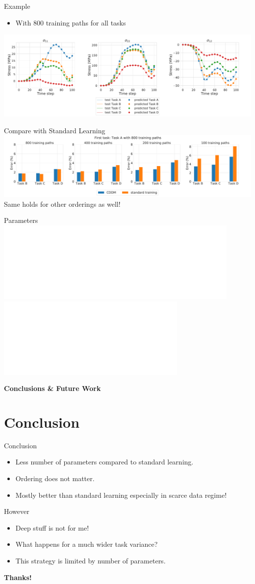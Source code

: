 \documentclass[aspectratio=169]{beamer}
\newcommand{\conc}{\color{Pink}\huge{\textbf{Conclusions \& Future Work}}}
\newcommand{\thnx}{\color{Pink}\huge{\textbf{Thanks!}}}
\begin{document}
\begin{frame}{Example}
    \begin{itemize}
      \item With 800 training paths for all tasks
    \end{itemize}
    \centering
    \includegraphics[width=\textwidth]{figures/example_paths.pdf}
\end{frame}

\begin{frame}{Compare with Standard Learning}
    \centering
    \includegraphics[width=\textwidth]{figures/std_cl.pdf}
    \color{Pink} Same holds for other orderings as well! 
\end{frame}

\begin{frame}{Parameters}
    \centering
    \includegraphics<1>[width=0.9\textwidth]{figures/total_param.pdf}
    \includegraphics<2>[width=0.7\textwidth]{figures/overlap.pdf}
\end{frame}

\begin{frame}
	\centering
	\conc
\end{frame}

\section{Conclusion}
\begin{frame}{Conclusion}
  \centering
  \begin{itemize}
    \item Less number of parameters compared to standard learning.
    \item Ordering does not matter.
    \item Mostly better than standard learning especially in scarce data regime!
  \end{itemize}
\end{frame}

\begin{frame}{However}
  \centering
  \begin{itemize}
    \item Deep stuff is not for me!
    \item What happens for a much wider task variance?
    \item This strategy is limited by number of parameters.
  \end{itemize}
\end{frame}

\begin{frame}
	\centering
  \thnx
\end{frame}
\end{document}
